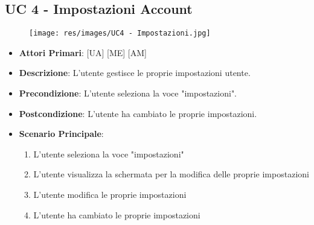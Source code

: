	\subsection{UC 4 - Impostazioni Account}
		
		\begin{figure}[H]
			\centering
			\texttt{[image: res/images/UC4 - Impostazioni.jpg]}
		\end{figure}
		
		\begin{itemize}
			\item \textbf{Attori Primari}: [UA] [ME] [AM]
			\item \textbf{Descrizione}: L'utente gestisce le proprie impostazioni utente.
			\item \textbf{Precondizione}: L'utente seleziona la voce "impostazioni".
			\item \textbf{Postcondizione}: L'utente ha cambiato le proprie impostazioni.
			\item \textbf{Scenario Principale}:
			\begin{enumerate}
				\item{L'utente seleziona la voce "impostazioni"}
				\item{L'utente visualizza la schermata per la modifica delle proprie impostazioni}
				\item{L'utente modifica le proprie impostazioni}
				\item{L'utente ha cambiato le proprie impostazioni}
			\end{enumerate}	
		\end{itemize}
			

